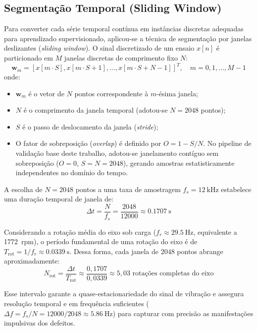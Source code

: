 \subsection{Segmentação Temporal (Sliding Window)}
Para converter cada série temporal contínua em instâncias discretas adequadas para aprendizado supervisionado, aplicou-se a técnica de segmentação por janelas deslizantes (\textit{sliding window}). O sinal discretizado de um ensaio $x[n]$ é particionado em $M$ janelas discretas de comprimento fixo $N$:
\begin{equation}
    \mathbf{w}_m = [x[m \cdot S], x[m \cdot S + 1], \dots, x[m \cdot S + N - 1]]^T, \quad m = 0, 1, \dots, M-1
    \label{eq:sliding_window}
\end{equation}
onde:
\begin{itemize}
    \item $\mathbf{w}_m$ é o vetor de $N$ pontos correspondente à $m$-ésima janela;
    \item $N$ é o comprimento da janela temporal (adotou-se $N = 2048$ pontos);
    \item $S$ é o passo de deslocamento da janela (\textit{stride});
    \item O fator de sobreposição (\textit{overlap}) é definido por $O = 1 - S/N$. No pipeline de validação base deste trabalho, adotou-se janelamento contíguo sem sobreposição ($O = 0$, $S = N = 2048$), gerando amostras estatisticamente independentes no domínio do tempo.
\end{itemize}

A escolha de $N = 2048$ pontos a uma taxa de amostragem $f_s = \SI{12}{\kilo\hertz}$ estabelece uma duração temporal de janela de:
\begin{equation}
    \Delta t = \frac{N}{f_s} = \frac{2048}{12000} \approx \SI{0,1707}{\second}
    \label{eq:duracao_janela}
\end{equation}

Considerando a rotação média do eixo sob carga ($f_r \approx \SI{29,5}{\hertz}$, equivalente a \SI{1772}{rpm}), o período fundamental de uma rotação do eixo é de $T_{\text{rot}} = 1/f_r \approx \SI{0,0339}{\second}$. Dessa forma, cada janela de $2048$ pontos abrange aproximadamente:
\begin{equation}
    N_{\text{rot}} = \frac{\Delta t}{T_{\text{rot}}} \approx \frac{0,1707}{0,0339} \approx 5,03 \text{ rotações completas do eixo}
    \label{eq:num_rotacoes}
\end{equation}

Esse intervalo garante a quase-estacionariedade do sinal de vibração e assegura resolução temporal e em frequência suficientes ($\Delta f = f_s / N = 12000 / 2048 \approx \SI{5,86}{\hertz}$) para capturar com precisão as manifestações impulsivas dos defeitos.

